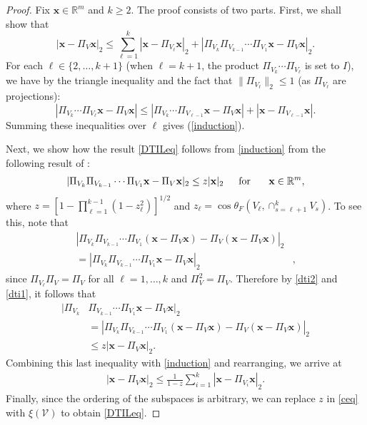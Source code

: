 \documentclass[journal, twocolumn]{IEEEtran}
\begin{document}
\begin{proof} 
Fix $\mathbf{x} \in \mathbb{R}^m$ and $k \geq 2$. The proof consists of two parts. First, we shall show that 
\begin{equation}\label{induction}
|\mathbf{x} - \Pi_V\mathbf{x}|_2 \leq \sum_{\ell=1}^k |\mathbf{x} - \Pi_{V_{\ell}} \mathbf{x}|_2 + |\Pi_{V_{k}}\Pi_{V_{k-1}}\cdots\Pi_{V_{1}} \mathbf{x} - \Pi_V \mathbf{x}|_2.
\end{equation}
For each $\ell \in \{2, \ldots, k+1\}$ (when $\ell = k+1$, the product $\Pi_{V_k} \cdots \Pi_{V_{\ell}}$ is set to $I$), we have by the triangle inequality and the fact that $\|\Pi_{V_{\ell}}\|_2 \leq 1$ (as $\Pi_{V_{\ell}}$ are projections):
\begin{equation}
|\Pi_{V_k} \cdots \Pi_{V_{\ell}}\mathbf{x} - \Pi_V \mathbf{x}|  \leq  |\Pi_{V_k} \cdots \Pi_{V_{\ell-1}}\mathbf{x} - \Pi_V \mathbf{x}| + 
|\mathbf{x} - \Pi_{V_{\ell-1}}\mathbf{x}|.
\end{equation}
Summing these inequalities over $\ell$ gives (\ref{induction}).

Next, we show how the result \eqref{DTILeq} follows from \eqref{induction} from the following result of \cite[Theorem 9.33]{Deutsch12}:
\begin{align}\label{dti2}
|\Pi_{V_k}\Pi_{V_{k-1}}\cdots\Pi_{V_1} \mathbf{x} - \Pi_V\mathbf{x}|_2 \leq z |\mathbf{x}|_2 \indent \text{for } \indent \mathbf{x} \in \mathbb{R}^m,
\end{align}
where $z= \left[1 - \prod_{\ell =1}^{k-1}(1-z_{\ell}^2)\right]^{1/2}$ and $z_{\ell} = \cos\theta_F\left(V_{\ell}, \cap_{s=\ell+1}^k V_s\right)$. To see this, note that
\begin{align}\label{dti1}
|\Pi_{V_k}\Pi_{V_{k-1}}\cdots\Pi_{V_1}(\mathbf{x} - \Pi_V\mathbf{x}) - \Pi_V(\mathbf{x} - \Pi_V\mathbf{x})|_2& \\
= |\Pi_{V_k}\Pi_{V_{k-1}}\cdots\Pi_{V_1} \mathbf{x} - \Pi_V \mathbf{x} |_2&,
\end{align}
since $\Pi_{V_\ell} \Pi_V = \Pi_V$ for all $\ell = 1, \ldots, k$ and $\Pi_V^2 = \Pi_V$.
Therefore by \eqref{dti2} and \eqref{dti1}, it follows that
\begin{align*}
|\Pi_{V_k}&\Pi_{V_{k-1}}\cdots\Pi_{V_1} \mathbf{x} - \Pi_V \mathbf{x} |_2 \\
&= |\Pi_{V_k}\Pi_{V_{k-1}}\cdots\Pi_{V_1}(\mathbf{x} - \Pi_V\mathbf{x}) - \Pi_V(\mathbf{x} - \Pi_V\mathbf{x})|_2 \\
&\leq z |\mathbf{x} - \Pi_V\mathbf{x}|_2.
\end{align*}
Combining this last inequality with \eqref{induction} and rearranging, we arrive at
\begin{align}\label{ceq}
|\mathbf{x} - \Pi_V \mathbf{x}|_2 \leq \frac{1}{1 - z} \sum_{i=1}^k |\mathbf{x} - \Pi_{V_i} \mathbf{x}|_2.
\end{align}
Finally, since the ordering of the subspaces is arbitrary, we can replace $z$ in \eqref{ceq} with $\xi(\mathcal{V})$ to obtain \eqref{DTILeq}.
\end{proof}
\end{document}
